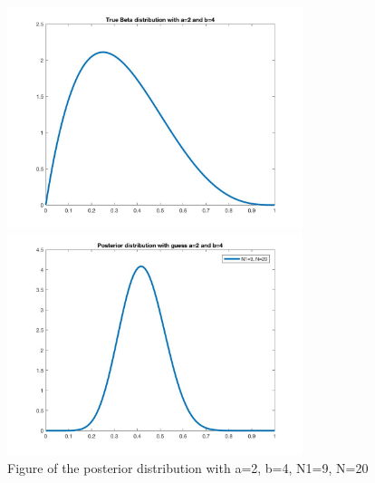 \documentclass[a4paper]{article}
\begin{document}
\begin{spacing}{2.0}
\begin{enumerate}[(1)]
\begin{figure}[htbp]
\begin{minipage}[t]{0.5\linewidth}
\centering
\includegraphics[width=3.4in]{Pbeta2.jpg}
\caption{Figure of the beta distribution with a=2 and b=4}
\label{beta2}
\end{minipage}
\begin{minipage}[t]{0.5\linewidth}
\centering
\includegraphics[width=3.4in]{posterior4.jpg}
\caption{Figure of the posterior distribution with a=2, b=4, N1=9, N=20}
\label{posterior4}
\end{minipage}
\end{figure}


\end{enumerate}
\end{spacing}
\end{document}
